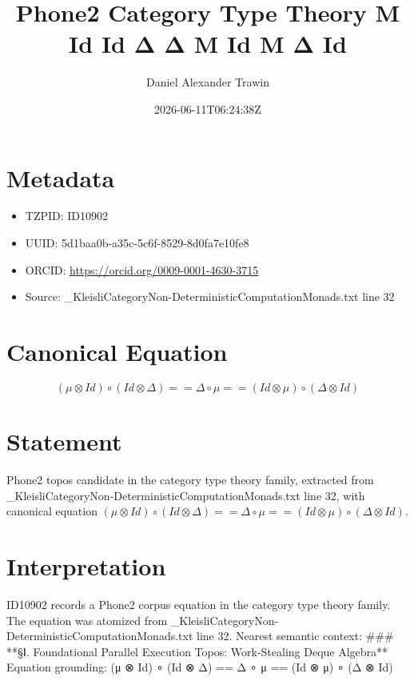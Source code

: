 \documentclass[11pt]{article}
\title{Phone2 Category Type Theory Μ Id Id Δ Δ Μ Id Μ Δ Id}
\author{Daniel Alexander Trawin}
\date{2026-06-11T06:24:38Z}
\begin{document}
\maketitle
\section*{Metadata}
\begin{itemize}
\item TZPID: ID10902
\item UUID: 5d1baa0b-a35c-5c6f-8529-8d0fa7e10fe8
\item ORCID: \url{https://orcid.org/0009-0001-4630-3715}
\item Source: _KleisliCategoryNon-DeterministicComputationMonads.txt line 32
\end{itemize}
\section*{Canonical Equation}
\[
(μ ⊗ Id) ∘ (Id ⊗ Δ) == Δ ∘ μ == (Id ⊗ μ) ∘ (Δ ⊗ Id)
\]
\section*{Statement}
Phone2 topos candidate in the category type theory family, extracted from _KleisliCategoryNon-DeterministicComputationMonads.txt line 32, with canonical equation $(μ ⊗ Id) ∘ (Id ⊗ Δ) == Δ ∘ μ == (Id ⊗ μ) ∘ (Δ ⊗ Id)$.
\section*{Interpretation}
ID10902 records a Phone2 corpus equation in the category type theory family. The equation was atomized from _KleisliCategoryNon-DeterministicComputationMonads.txt line 32. Nearest semantic context: ### **§Ⅰ. Foundational Parallel Execution Topos: Work-Stealing Deque Algebra** Equation grounding: (μ ⊗ Id) ∘ (Id ⊗ Δ) == Δ ∘ μ == (Id ⊗ μ) ∘ (Δ ⊗ Id)
\end{document}
